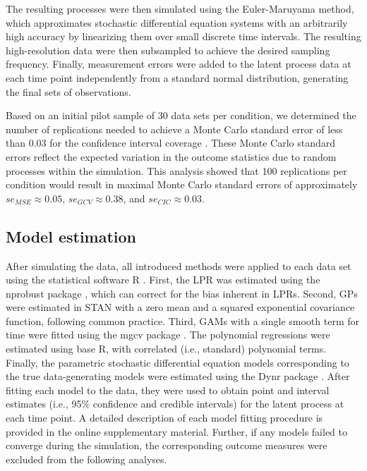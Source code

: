 \documentclass[man, floatsintext]{apa7}
\begin{document}
The resulting processes were then simulated using the Euler-Maruyama method,
which approximates stochastic differential equation systems with an arbitrarily
high accuracy by linearizing them over small discrete time intervals. The
resulting high-resolution data were then subsampled to achieve the desired
sampling frequency. Finally, measurement errors were added to the latent
process data at each time point independently from a standard normal
distribution, generating the final sets of observations.

Based on an initial pilot sample of 30 data sets per condition, we determined
the number of replications needed to achieve a Monte Carlo standard error of
less than 0.03 for the confidence interval coverage
\parencite{siepe_simulation_2023}. These Monte Carlo standard errors reflect
the expected variation in the outcome statistics due to random processes within
the simulation. This analysis showed that 100 replications per condition
would result in maximal Monte Carlo standard errors of approximately $se_{MSE}
  \approx 0.05$, $se_{GCV} \approx 0.38$, and $se_{CIC} \approx 0.03$.

\subsection{Model estimation}

After simulating the data, all introduced methods were applied to each data set
using the statistical software R \parencite{R-base}. First, the LPR was
estimated using the nprobust package \parencite{R-nprobust}, which can correct
for the bias inherent in LPRs. Second, GPs were estimated in STAN
\parencite{R-cmdstanr} with a zero mean and a squared exponential covariance
function, following common practice. Third, GAMs with a single smooth term for
time were fitted using the mgcv package \parencite{R-mgcv_a}. The polynomial
regressions were estimated using base R, with correlated (i.e., standard)
polynomial terms. Finally, the parametric stochastic differential equation
models corresponding to the true data-generating models were estimated using
the Dynr package \parencite{R-dynr}. After fitting each model to the data, they
were used to obtain point and interval estimates (i.e., 95\% confidence and
credible intervals) for the latent process at each time point. A detailed
description of each model fitting procedure is provided in the online
supplementary material. Further, if any models failed to converge during the
simulation, the corresponding outcome measures were excluded from the following
analyses.
\end{document}
